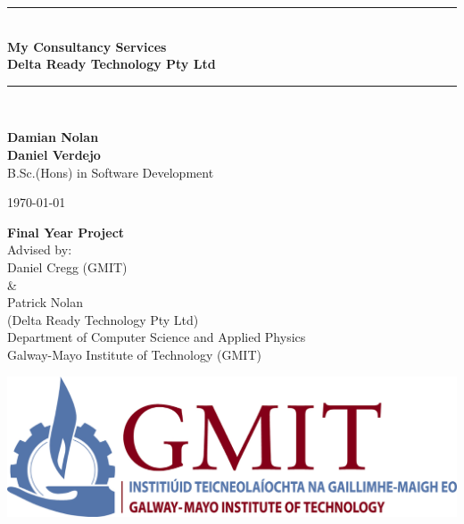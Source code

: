 \documentclass[12pt,a4paper,oneside,openany]{book}
\newcommand{\projecttitle}{My Consultancy Services}
\newcommand{\industrypartner}{Delta Ready Technology Pty Ltd}
\newcommand{\projectauthor}{Damian Nolan \\[0.2cm] Daniel Verdejo}
\newcommand{\projectadvisor}{Daniel Cregg (GMIT)}
\newcommand{\projectindustrialadvisor}{Patrick Nolan \\(Delta Ready Technology Pty Ltd)}
\newcommand{\projectprogramme}{B.Sc.(Hons) in Software Development}
\newcommand{\projectdate}{\today}
\begin{document}
  \begin{titlepage}
    \begin{minipage}[t][6cm]{\textwidth}
      \centering
      \rule{\linewidth}{0.5mm} \\[0.4cm]
      { \LARGE \bfseries \projecttitle \\[0.4cm] }
      { \bfseries \industrypartner \\[0.4cm]}
      \rule{\linewidth}{0.5mm} \\[0.8cm]
    \end{minipage}
    
    \begin{minipage}[t][5.5cm]{\textwidth}
      \centering
      \textbf{\projectauthor}\\[0.5cm]
      \projectprogramme
    \end{minipage}
  
    \begin{minipage}[t][1cm]{\textwidth}
      \centering
      \textsc{\projectdate}
    \end{minipage}
      
    \begin{minipage}[t][4cm]{\textwidth}
      \centering
      \textbf{Final Year Project}\\[0.3cm]
      Advised by: \\ 
      \projectadvisor\\[0.1cm]
      \& \\
      \projectindustrialadvisor \\[0.1cm]
      Department of Computer Science and Applied Physics\\
      Galway-Mayo Institute of Technology (GMIT)
    \end{minipage}
  
    \begin{center}    
      \includegraphics{img/gmit-logo.jpg}
    \end{center}
  \end{titlepage}
  \setcounter{page}{2}
  \tableofcontents
  
  \newpage
  \printbibliography
\end{document}
